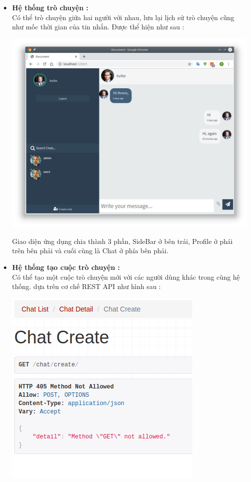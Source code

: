 \documentclass[a4paper]{article}
\begin{document}
\begin{itemize}
		\item \textbf{Hệ thống trò chuyện :} \\
		Có thể trò chuyện giữa hai người với nhau, lưu lại lịch sử trò chuyện cũng như mốc thời gian của tin nhắn. Được thể hiện như sau : 
			\begin{center}
				\includegraphics[scale=0.5]{Images/chatlog.png}
			\end{center}
		Giao diện ứng dụng chia thành 3 phần, SideBar ở bên trái, Profile ở phái trên bên phải và cuối cùng là Chat ở phía bên phải.
		\item \textbf{Hệ thống tạo cuộc trò chuyện :}\\
		Có thể tạo một cuộc trò chuyện mới với các người dùng khác trong cùng hệ thống. dựa trên cơ chế REST API như hình sau : 
			\begin{center}
				\includegraphics[scale=0.7]{Images/createchat.png}

\end{center}
\end{itemize}
\end{document}
